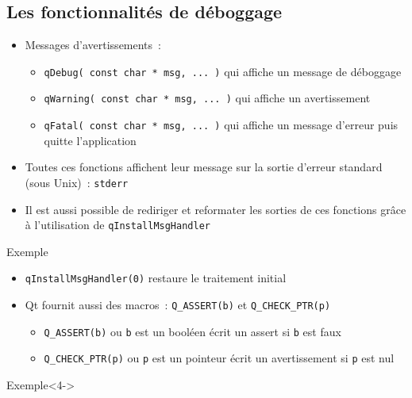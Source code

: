 \documentclass{beamer} %
\begin{document}
\subsection{Les fonctionnalités de déboggage}
\begin{frame}
	\begin{itemize}
	\item Messages d'avertissements~:
		\begin{itemize}
		\item<2-> \texttt{qDebug( const char * msg, ... )} qui affiche un message de déboggage
		\item<3-> \texttt{qWarning( const char * msg, ... )} qui affiche un avertissement
		\item<4-> \texttt{qFatal( const char * msg, ... )} qui affiche un message d'erreur puis quitte l'application
		\end{itemize}
	\item<5-> Toutes ces fonctions affichent leur message sur la sortie d'erreur standard (sous Unix)~: \texttt{stderr}
	\item<6-> Il est aussi possible de rediriger et reformater les sorties de ces fonctions grâce à l'utilisation de \texttt{qInstallMsgHandler}
	\end{itemize}
\end{frame}

\begin{frame}
	\begin{exampleblock}{Exemple}
		
	\end{exampleblock}

	\begin{itemize}
	\item<2-> \texttt{qInstallMsgHandler(0)} restaure le traitement initial
	\end{itemize}
\end{frame}

\begin{frame}
	\begin{itemize}
	\item Qt fournit aussi des macros~: \texttt{Q\_ASSERT(b)} et \texttt{Q\_CHECK\_PTR(p)}
		\begin{itemize}
		\item<2-> \texttt{Q\_ASSERT(b)} ou \texttt{b} est un booléen écrit un assert si \texttt{b} est faux
		\item<3-> \texttt{Q\_CHECK\_PTR(p)} ou \texttt{p} est un pointeur écrit un avertissement si \texttt{p} est nul
		\end{itemize}
	\end{itemize}

	\begin{exampleblock}{Exemple}<4->
		
	\end{exampleblock}
\end{frame}
\end{document}
